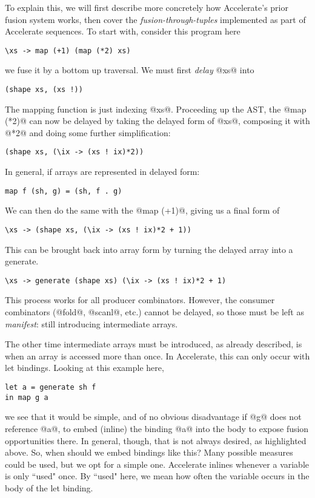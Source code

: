 To explain this, we will first describe more concretely how Accelerate's prior fusion system works, then cover the \emph{fusion-through-tuples} implemented as part of Accelerate sequences. To start with, consider this program here
%
\begin{lstlisting}
\xs -> map (+1) (map (*2) xs)
\end{lstlisting}
%
we fuse it by a bottom up traversal. We must first \emph{delay} @xs@ into
%
\begin{lstlisting}
(shape xs, (xs !))
\end{lstlisting}
%
The mapping function is just indexing @xs@. Proceeding up the AST, the @map (*2)@ can now be delayed by taking the delayed form of @xs@, composing it with @*2@ and doing some further simplification:
%
\begin{lstlisting}
(shape xs, (\ix -> (xs ! ix)*2))
\end{lstlisting}
%
In general, if arrays are represented in delayed form:
%
\begin{lstlisting}
map f (sh, g) = (sh, f . g)
\end{lstlisting}
%
We can then do the same with the @map (+1)@, giving us a final form of
%
\begin{lstlisting}
\xs -> (shape xs, (\ix -> (xs ! ix)*2 + 1))
\end{lstlisting}
%
This can be brought back into array form by turning the delayed array into a generate.
%
\begin{lstlisting}
\xs -> generate (shape xs) (\ix -> (xs ! ix)*2 + 1)
\end{lstlisting}
%

This process works for all producer combinators. However, the consumer combinators (@fold@, @scanl@, etc.) cannot be delayed, so those must be left as \emph{manifest}: still introducing intermediate arrays.

The other time intermediate arrays must be introduced, as already described, is when an array is accessed more than once. In Accelerate, this can only occur with let bindings. Looking at this example here,
%
\begin{lstlisting}
let a = generate sh f
in map g a
\end{lstlisting}
%
we see that it would be simple, and of no obvious disadvantage if @g@ does not reference @a@, to embed (inline) the binding @a@ into the body to expose fusion opportunities there. In general, though, that is not always desired, as highlighted above. So, when should we embed bindings like this? Many possible measures could be used, but we opt for a simple one. Accelerate inlines whenever a variable is only ``used" once. By ``used" here, we mean how often the variable occurs in the body of the let binding.

